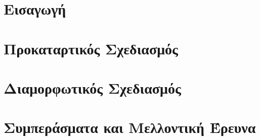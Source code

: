\documentclass{report}
\begin{document}


\tableofcontents

\begin{abstract}
    
\end{abstract}

\begin{otherlanguage}{english}
\begin{abstract}
    
\end{abstract}
\end{otherlanguage}

\chapter{Εισαγωγή}


\chapter{Προκαταρτικός Σχεδιασμός}



\chapter{Διαμορφωτικός Σχεδιασμός}


\chapter{Συμπεράσματα και Μελλοντική Έρευνα}



\listoffigures
\listoftables

\printbibliography
\nocite{*}
\end{document}

